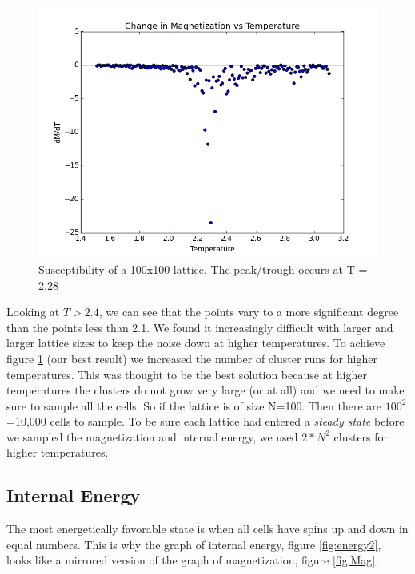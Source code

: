 \documentclass[a4paper,twoside,12pt]{article}
\begin{document}
\begin{figure}[h]
\centering
\includegraphics[scale=0.5]{Figures/dMdT.png}
\caption{Susceptibility of a 100x100 lattice. The peak/trough occurs at T = 2.28}
\label{fig:dMdT}
\end{figure} 

\noindent Looking at $T > 2.4$, we can see that the points vary to a more significant degree than the points less than 2.1. We found it increasingly difficult with larger and larger lattice sizes to keep the noise down at higher temperatures. To achieve figure \ref{fig:dMdT} (our best result) we increased the number of cluster runs for higher temperatures. This was thought to be the best solution because at higher temperatures the clusters do not grow very large (or at all) and we need to make sure to sample all the cells. So if the lattice is of size N=100. Then there are $100^2$=10,000 cells to sample. To be sure each lattice had entered a \textit{steady state} before we sampled the magnetization and internal energy, we used $2*N^2$ clusters for higher temperatures.
 
\subsection{Internal Energy}
The most energetically favorable state is when all cells have spins up and down in equal numbers.  This is why the graph of internal energy, figure \ref{fig:energy2}, looks like a mirrored version of the graph of magnetization, figure \ref{fig:Mag}. 
\end{document}
